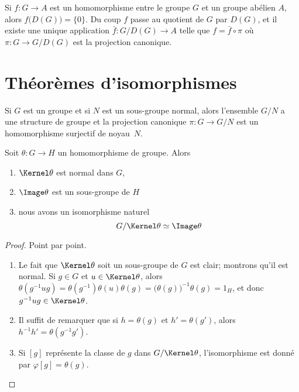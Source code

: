 Si \( f\colon G\to A\) est un homomorphisme entre le groupe \( G\) et un groupe abélien \( A\), alors \( f\big( D(G) \big)=\{ 0 \}\). Du coup \( f\) passe au quotient de \( G\) par \( D(G)\), et il existe une unique application \( \bar f\colon G/D(G)\to A\) telle que \( f=\bar f\circ \pi\) où \( \pi\colon G\to G/D(G)\) est la projection canonique.

\section{Théorèmes d'isomorphismes}

Si \( G\) est un groupe et si \( N\) est un sous-groupe normal, alors l'ensemble \( G/N\) a une structure de groupe et la projection canonique \( \pi\colon G\to G/N\) est un homomorphisme surjectif de noyau~\( N\).

\begin{theorem}        \label{ThoPremierthoisomo}
    Soit \( \theta\colon G\to H\) un homomorphisme de groupe. Alors
    \begin{enumerate}
        \item
            \( \Kernel\theta\) est normal dans \( G\),
        \item
            \( \Image \theta\) est un sous-groupe de \( H\)
        \item   \label{ItemWLCLdk}
            nous avons un isomorphisme naturel
            \begin{equation}
                G/\Kernel\theta\simeq \Image\theta
            \end{equation}
    \end{enumerate}
\end{theorem}

\begin{proof}
    Point par point.
    \begin{enumerate}
        \item
            Le fait que  \( \Kernel\theta\) soit un sous-groupe de \( G\) est clair; montrons qu'il est normal. Si \( g \in G \) et \( u \in \Kernel\theta\), alors \(\theta (g^{-1} u g) = \theta(g^{-1})\theta(u)\theta(g) = \bigl(\theta(g)\bigr)^{-1}\theta(g) = 1_H \), et donc \( g^{-1} u g \in \Kernel\theta\).
        \item
            Il suffit de remarquer que si \( h = \theta(g) \) et \( h' = \theta(g') \), alors \( h^{-1} h' = \theta(g^{-1} g') \).
        \item
            Si \( [g]\) représente la classe de \( g\) dans \( G/\Kernel\theta\), l'isomorphisme est donné par \( \varphi[g]=\theta(g)\).
    \end{enumerate}
\end{proof}


